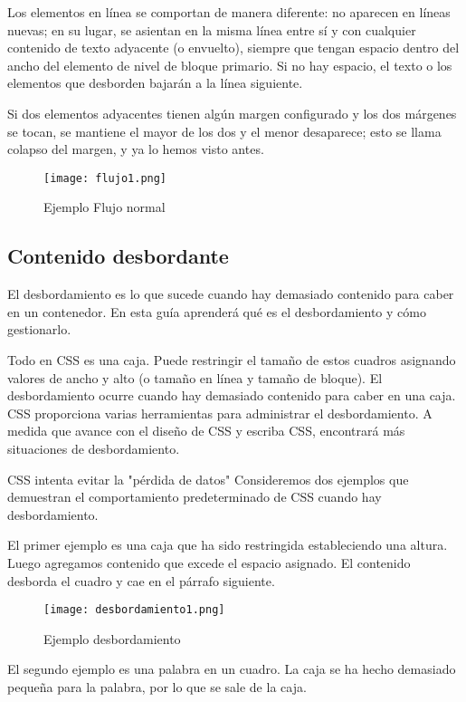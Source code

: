 \begin{enumerate}
Los elementos en línea se comportan de manera diferente: no aparecen en líneas nuevas; en su lugar, se asientan en la misma línea entre sí y con cualquier contenido de texto adyacente (o envuelto), siempre que tengan espacio dentro del ancho del elemento de nivel de bloque primario. Si no hay espacio, el texto o los elementos que desborden bajarán a la línea siguiente.

Si dos elementos adyacentes tienen algún margen configurado y los dos márgenes se tocan, se mantiene el mayor de los dos y el menor desaparece; esto se llama colapso del margen, y ya lo hemos visto antes.

\begin{figure}[H]
	\center
	\texttt{[image: flujo1.png]}
	\caption{Ejemplo Flujo normal}
	\label{fig:super}
\end{figure}

\subsection{Contenido desbordante}


El desbordamiento es lo que sucede cuando hay demasiado contenido para caber en un contenedor. En esta guía aprenderá qué es el desbordamiento y cómo gestionarlo.

Todo en CSS es una caja. Puede restringir el tamaño de estos cuadros asignando valores de ancho y alto (o tamaño en línea y tamaño de bloque). El desbordamiento ocurre cuando hay demasiado contenido para caber en una caja. CSS proporciona varias herramientas para administrar el desbordamiento. A medida que avance con el diseño de CSS y escriba CSS, encontrará más situaciones de desbordamiento.

CSS intenta evitar la "pérdida de datos"
Consideremos dos ejemplos que demuestran el comportamiento predeterminado de CSS cuando hay desbordamiento.

El primer ejemplo es una caja que ha sido restringida estableciendo una altura. Luego agregamos contenido que excede el espacio asignado. El contenido desborda el cuadro y cae en el párrafo siguiente.


\begin{figure}[H]
	\center
	\texttt{[image: desbordamiento1.png]}
	\caption{Ejemplo desbordamiento}
	\label{fig:super}
\end{figure}

El segundo ejemplo es una palabra en un cuadro. La caja se ha hecho demasiado pequeña para la palabra, por lo que se sale de la caja.


\end{enumerate}
